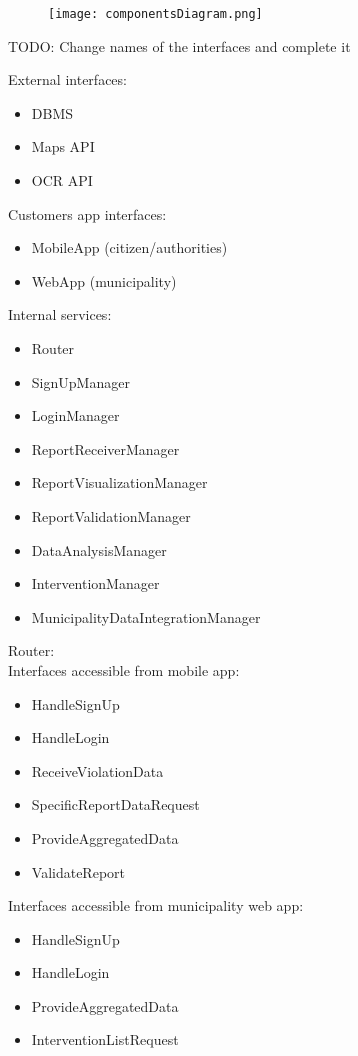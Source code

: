 \begin{figure}[H]
	\texttt{[image: componentsDiagram.png]}
\end{figure}
TODO: Change names of the interfaces and complete it

External interfaces:
\begin{itemize}
	\item DBMS
	\item Maps API
	\item OCR API
\end{itemize}

Customers app interfaces:
\begin{itemize}
	\item MobileApp (citizen/authorities)
	\item WebApp (municipality)
\end{itemize}

Internal services:
\begin{itemize}
	\item Router
	\item SignUpManager
	\item LoginManager
	\item ReportReceiverManager
	\item ReportVisualizationManager
	\item ReportValidationManager
	\item DataAnalysisManager
	\item InterventionManager
	\item MunicipalityDataIntegrationManager
\end{itemize}

\bigskip
Router:\\
Interfaces accessible from mobile app:
\begin{itemize}
	\item HandleSignUp
	\item HandleLogin
	\item ReceiveViolationData
	\item SpecificReportDataRequest
	\item ProvideAggregatedData
	\item ValidateReport
\end{itemize}
Interfaces accessible from municipality web app:
\begin{itemize}
	\item HandleSignUp
	\item HandleLogin
	\item ProvideAggregatedData
	\item InterventionListRequest 
\end{itemize}

